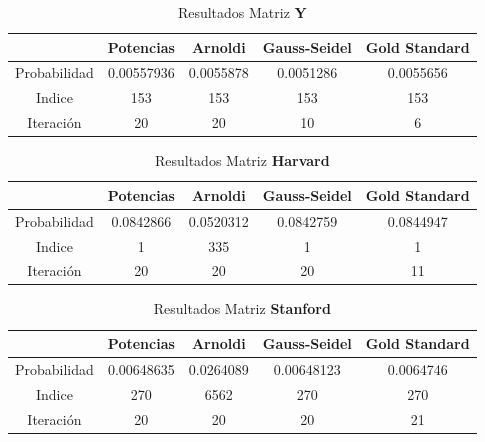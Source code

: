 \documentclass{article}
\begin{document}
\begin{table}[ht!]
  \begin{center}
    \caption{Resultados Matriz \textbf{Y}}
    \label{tab:table2}
    \begin{tabular}{ccccc}
      \toprule
       & Potencias & Arnoldi &Gauss-Seidel &Gold Standard\\
      \midrule
      Probabilidad &0.00557936  &  0.0055878 &0.0051286& 0.0055656\\
      Indice & 153 & 153& 153&153\\
      Iteración & 20 & 20 &10 &6\\
      \bottomrule
    \end{tabular}
  \end{center}
\end{table}

\begin{table}[ht!]
  \begin{center}
    \caption{Resultados Matriz \textbf{Harvard}}
    \label{tab:table3}
    \begin{tabular}{ccccc}
      \toprule
       & Potencias & Arnoldi & Gauss-Seidel&Gold Standard\\
      \midrule
      Probabilidad &0.0842866 &0.0520312 &0.0842759 &0.0844947\\
      Indice & 1 & 335 &1 &1\\
      Iteración & 20 & 20 &20 &11\\
      \bottomrule
    \end{tabular}
  \end{center}
\end{table}

\begin{table}[ht!]
  \begin{center}
    \caption{Resultados Matriz \textbf{Stanford}}
    \label{tab:table4}
    \begin{tabular}{ccccc}
      \toprule
       & Potencias & Arnoldi & Gauss-Seidel&Gold Standard\\
      \midrule
      Probabilidad & 0.00648635& 0.0264089 &0.00648123  &0.0064746\\
      Indice & 270 & 6562 & 270&270\\
      Iteración & 20 & 20 & 20&21\\
      \bottomrule
    \end{tabular}
  \end{center}
\end{table}
\end{document}
